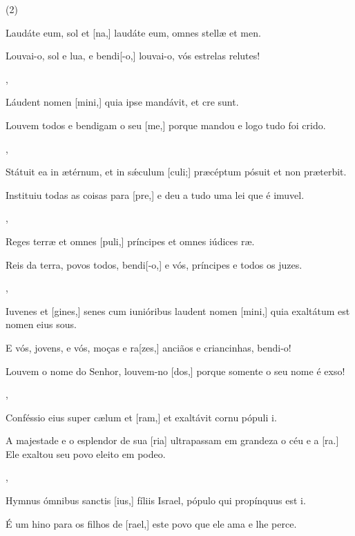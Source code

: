 \SetVersePairs(2){
  {\item {}Laudáte eum, sol et [na,] laudáte eum, omnes stellæ et men.~\Responsorium}%
    {\item {}Louvai-o, sol e lua, e bendi[-o,] louvai-o, vós estrelas relutes!~\Responsorium},
  {\item {}Láudent nomen [mini,] quia ipse mandávit, et cre sunt.~\Responsorium}%
    {\item {}Louvem todos e bendigam o seu [me,] porque mandou e logo tudo foi crido.~\Responsorium},
  {\item {}Státuit ea in ætérnum, et in sǽculum [culi;] præcéptum pósuit et non præterbit.~\Responsorium}%
    {\item {}Instituiu todas as coisas para [pre,] e deu a tudo uma lei que é imuvel.~\Responsorium},
  {\item {}Reges terræ et omnes [puli,] príncipes et omnes iúdices ræ.~\Responsorium}%
    {\item {}Reis da terra, povos todos, bendi[-o,] e vós, príncipes e todos os juzes.~\Responsorium},
  {\item {}Iuvenes et [gines,] senes cum iunióribus laudent nomen [mini,] quia exaltátum est nomen eius sous.~\Responsorium}%
    {\item {}E vós, jovens, e vós, moças e ra[zes,] anciãos e criancinhas, bendi-o!~\Responsorium
      \item {}Louvem o nome do Senhor, louvem-no [dos,] porque somente o seu nome é exso!~\Responsorium},
  {\item {}Conféssio eius super cælum et [ram,] et exaltávit cornu pópuli i.~\Responsorium}%
    {\item {}A majestade e o esplendor de sua [ria] ultrapassam em grandeza o céu e a [ra.] Ele exaltou seu povo eleito em podeo.~\Responsorium},
  {\item {}Hymnus ómnibus sanctis [ius,] fíliis Israel, pópulo qui propínquus est i.~\Responsorium}%
    {\item {}É um hino para os filhos de [rael,] este povo que ele ama e lhe perce.~\Responsorium}
}